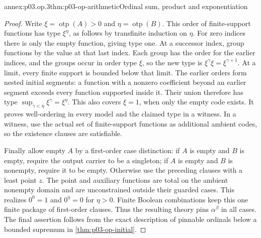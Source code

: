 \begin{annexitem}{annex:p03.op.3}{thm:p03-op-arithmetic}{Ordinal sum, product and exponentiation}
\begin{proof}
Write \(\xi=\operatorname{otp}(A)>0\) and
\(\eta=\operatorname{otp}(B)\). This order of finite-support
functions has type \(\xi^\eta\), as follows by transfinite
induction on \(\eta\). For zero indices there is only the
empty function, giving type one. At a successor index, group
functions by the value at that last index. Each group has the
order for the earlier indices, and the groups occur in order
type \(\xi\), so the new type is
\(\xi^\gamma\xi=\xi^{\gamma+1}\).
At a limit, every finite support is bounded below that limit.
The earlier orders form nested initial segments: a function
with a nonzero coefficient beyond an earlier segment exceeds
every function supported inside it. Their union therefore has
type \(\sup_{\gamma<\eta}\xi^\gamma=\xi^\eta\).
This also covers \(\xi=1\), when only the empty code exists.
It proves well-ordering in every model and the claimed type
in a witness. In a witness, use the actual set of finite-support
functions as additional ambient codes, so the existence clauses
are satisfiable.

Finally allow empty \(A\) by a first-order case distinction:
if \(A\) is empty and \(B\) is empty, require the output
carrier to be a singleton; if \(A\) is empty and \(B\) is
nonempty, require it to be empty. Otherwise use the preceding
clauses with a least point \(z\). The point and auxiliary
functions are total on the ambient nonempty domain and are
unconstrained outside their guarded cases. This realizes
\(0^0=1\) and \(0^\eta=0\) for \(\eta>0\).
Finite Boolean combinations keep this one finite package of
first-order clauses. Thus the resulting theory pins
\(\alpha^\beta\) in all cases. The final assertion follows
from the exact description of pinnable ordinals below a bounded
supremum in \cref{thm:p03-op-initial}.
\end{proof}
\end{annexitem}
